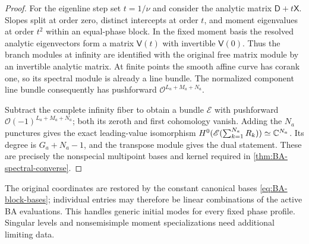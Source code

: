 \begin{proof}
For the eigenline step set $t=1/\nu$ and consider the analytic
matrix $\mathsf D+t\mathsf X$. Slopes split at order zero, distinct
intercepts at order $t$, and moment eigenvalues at order $t^2$ within
an equal-phase block. In the fixed moment basis the resolved
analytic eigenvectors form a matrix $\mathsf V(t)$ with invertible
$\mathsf V(0)$. Thus the branch modules at infinity are identified
with the original free matrix module by an invertible analytic
matrix. At finite points the smooth affine curve has corank one,
so its spectral module is already a line bundle. The normalized
component line bundle consequently has pushforward
$\mathcal O^{L_a+M_a+N_a}$.

Subtract the complete infinity fiber to obtain a bundle $\mathscr E$
with pushforward $\mathcal O(-1)^{L_a+M_a+N_a}$; both its zeroth
and first cohomology vanish. Adding the $N_a$ punctures gives the
exact leading-value isomorphism
$H^0(\mathscr E(\sum_{k=1}^{N_a}R_k))\simeq\mathbb C^{N_a}$.
Its degree is $G_a+N_a-1$, and the transpose module gives the dual
statement. These are precisely the nonspecial multipoint bases and
kernel required in \cref{thm:BA-spectral-converse}.
\end{proof}

The original coordinates are restored by the constant canonical
bases \cref{eq:BA-block-bases}; individual entries may therefore be
linear combinations of the active BA evaluations. This handles
generic initial modes for every fixed phase profile. Singular levels
and nonsemisimple moment specializations need additional limiting data.
